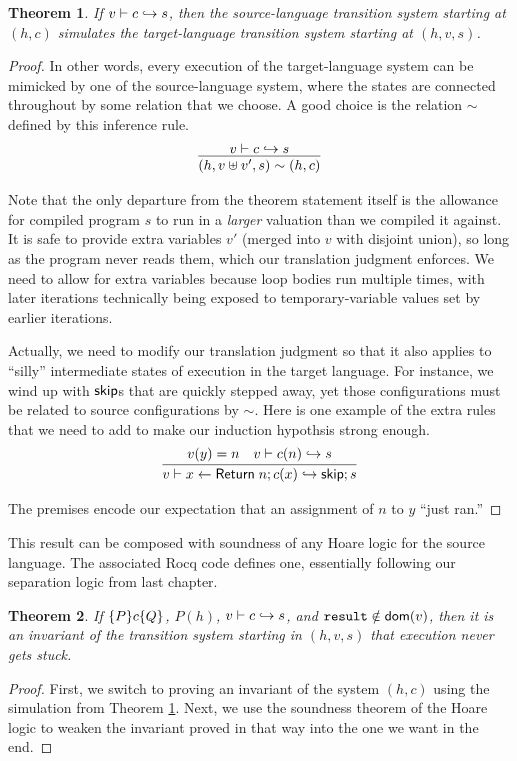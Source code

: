 \documentclass{amsbook}
\newtheorem{theorem}{Theorem}[chapter]
\theoremstyle{definition}
\theoremstyle{remark}
\numberwithin{section}{chapter}
\numberwithin{equation}{chapter}
\begin{document}
\begin{theorem}\label{dscompsim}
  If $v \vdash c \hookrightarrow s$, then the source-language transition system starting at $(h, c)$ simulates the target-language transition system starting at $(h, v, s)$.
\end{theorem}
\begin{proof}
  In other words, every execution of the target-language system can be mimicked by one of the source-language system, where the states are connected throughout by some relation that we choose.
  A good choice is the relation $\sim$ defined by this inference rule.
  $$\infer{(h, v \uplus v', s) \sim (h, c)}{
    \dscomp{v}{c}{s}
  }$$

  Note that the only departure from the theorem statement itself is the allowance for compiled program $s$ to run in a \emph{larger} valuation than we compiled it against.
  It is safe to provide extra variables $v'$ (merged into $v$ with disjoint union), so long as the program never reads them, which our translation judgment enforces.
  We need to allow for extra variables because loop bodies run multiple times, with later iterations technically being exposed to temporary-variable values set by earlier iterations.

  Actually, we need to modify our translation judgment so that it also applies to ``silly'' intermediate states of execution in the target language.
  For instance, we wind up with $\mathsf{skip}$s that are quickly stepped away, yet those configurations must be related to source configurations by $\sim$.
  Here is one example of the extra rules that we need to add to make our induction hypothsis strong enough.
  $$\infer{\dscomp{v}{x \leftarrow \mt{Return} \; n; c(x)}{\mt{skip}; s}}{
    v(y) = n
    & \dscomp{v}{c(n)}{s}
  }$$

  The premises encode our expectation that an assignment of $n$ to $y$ ``just ran.''
\end{proof}

This result can be composed with soundness of any Hoare logic for the source language.
The associated Rocq code defines one, essentially following our separation logic from last chapter.

\begin{theorem}
  If $\{P\} c \{Q\}$, $P(h)$, $v \vdash c \hookrightarrow s$, and $\texttt{result} \notin \mathsf{dom}(v)$, then it is an invariant of the transition system starting in $(h, v, s)$ that execution never gets stuck.
\end{theorem}
\begin{proof}
  First, we switch to proving an invariant of the system $(h, c)$ using the simulation from Theorem \ref{dscompsim}.
  Next, we use the soundness theorem of the Hoare logic to weaken the invariant proved in that way into the one we want in the end.
\end{proof}
\end{document}
